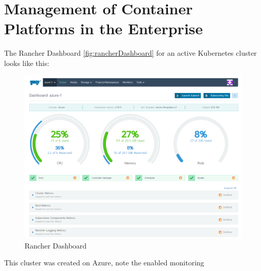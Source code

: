 %
%

\pagebreak
\section{Management of Container Platforms in the Enterprise}

\onehalfspacing

The Rancher Dashboard \autoref{fig:rancherDashboard} for an active Kubernetes cluster looks like this:

\begin{figure}[h]
\centering
\includegraphics[width=\linewidth]{images/dashboard}
\caption {Rancher Dashboard}
\label{fig:rancherDashboard}
\end{figure}

This cluster was created on Azure, note the enabled monitoring 
